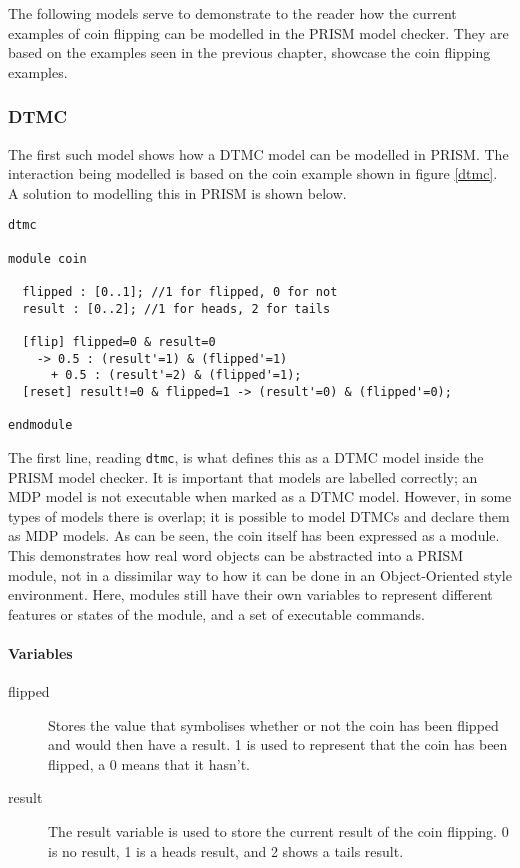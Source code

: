 \documentclass{l4proj}
\begin{document}
The following models serve to demonstrate to the reader how the current examples of coin flipping can be modelled in the PRISM model checker. They are based on the examples seen in the previous chapter, showcase the coin flipping examples.

\subsubsection{DTMC}

The first such model shows how a DTMC model can be modelled in PRISM. The interaction being modelled is based on the coin example shown in figure \ref{dtmc}. A solution to modelling this in PRISM is shown below.

\begin{verbatim}
dtmc

module coin

  flipped : [0..1]; //1 for flipped, 0 for not
  result : [0..2]; //1 for heads, 2 for tails

  [flip] flipped=0 & result=0 
    -> 0.5 : (result'=1) & (flipped'=1) 
      + 0.5 : (result'=2) & (flipped'=1);
  [reset] result!=0 & flipped=1 -> (result'=0) & (flipped'=0);
	
endmodule
\end{verbatim}

The first line, reading {\tt dtmc}, is what defines this as a DTMC model inside the PRISM model checker. It is important that models are labelled correctly; an MDP model is not executable when marked as a DTMC model. However, in some types of models there is overlap; it is possible to model DTMCs and declare them as MDP models.
As can be seen, the coin itself has been expressed as a module. This demonstrates how real word objects can be abstracted into a PRISM module, not in a dissimilar way to how it can be done in an Object-Oriented style environment. Here, modules still have their own variables to represent different features or states of the module, and a set of executable commands. 
\paragraph{Variables}
\begin{description}
\item[flipped] Stores the value that symbolises whether or not the coin has been flipped and would then have a result. 1 is used to represent that the coin has been flipped, a 0 means that it hasn't.
\item[result] The result variable is used to store the current result of the coin flipping. 0 is no result, 1 is a heads result, and 2 shows a tails result.
\end{description}
\end{document}

